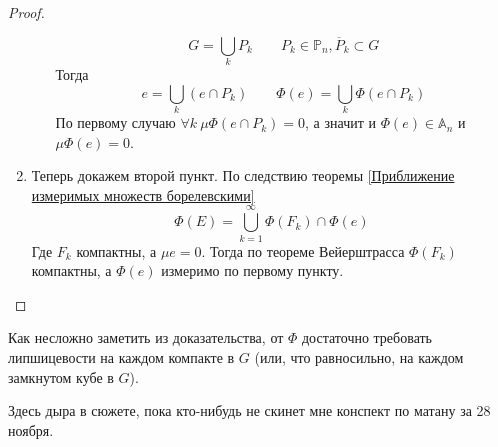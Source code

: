 \documentclass{article}
\begin{document}
\begin{proof}
\begin{enumerate}
\begin{enumerate}[a.]
                $$
                G=\bigcup\limits_kP_k\qquad P_k\in\mathbb P_n,\overline P_k\subset G
                $$
                Тогда
                $$
                e=\bigcup\limits_k(e\cap P_k)\qquad\Phi(e)=\bigcup\limits_k\Phi(e\cap P_k)
                $$
                По первому случаю $\forall k~\mu\Phi(e\cap P_k)=0$, а значит и $\Phi(e)\in\mathbb A_n$ и $\mu\Phi(e)=0$.
            \end{enumerate}
            \item Теперь докажем второй пункт. По следствию теоремы \ref{Приближение измеримых множеств борелевскими}
            $$
            \Phi(E)=\bigcup\limits_{k=1}^\infty\Phi(F_k)\cap\Phi(e)
            $$
            Где $F_k$ компактны, а $\mu e=0$. Тогда по теореме Вейерштрасса $\Phi(F_k)$ компактны, а $\Phi(e)$ измеримо по первому пункту.
        \end{enumerate}
    \end{proof}
    \begin{remark}
        Как несложно заметить из доказательства, от $\Phi$ достаточно требовать липшицевости на каждом компакте в $G$ (или, что равносильно, на каждом замкнутом кубе в $G$).
    \end{remark}
    \begin{remark}
        Здесь дыра в сюжете, пока кто-нибудь не скинет мне конспект по матану за 28 ноября.
    \end{remark}
\end{document}
